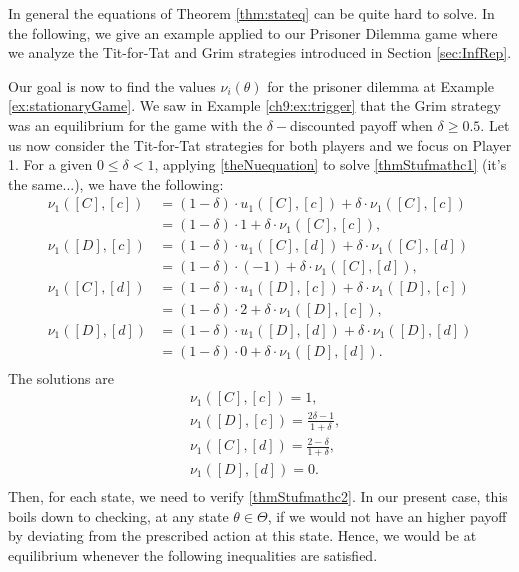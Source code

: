 In general the equations of Theorem \ref{thm:stateq} can be quite hard to solve. In the following, we give an example applied to our Prisoner Dilemma game where we analyze the Tit-for-Tat and Grim strategies introduced in Section \ref{sec:InfRep}.

\begin{example}
Our goal is now to find the values $\nu_i(\theta)$ for the prisoner dilemma at Example \ref{ex:stationaryGame}.
We saw in Example \ref{ch9:ex:trigger} that the Grim strategy was an equilibrium for the game with the $\delta-$discounted payoff when $\delta \geq 0.5$.
Let us now consider the Tit-for-Tat strategies for both players and we focus on Player 1.
For a given $0 \leq \delta < 1$, applying \eqref{theNuequation} to solve \eqref{thmStufmathc1} (it's the same...), we have the following:
$$
\begin{aligned}
\nu_1([C],[c])
& = (1-\delta) \cdot u_1([C],[c]) + \delta \cdot \nu_1([C],[c]) \\
& = (1-\delta) \cdot 1 + \delta \cdot \nu_1([C],[c]), \\
\nu_1([D],[c])
& = (1-\delta) \cdot u_1([C],[d]) + \delta \cdot \nu_1([C],[d]) \\ %
& = (1-\delta) \cdot (-1) + \delta \cdot \nu_1([C],[d]), \\
\nu_1([C],[d])
& = (1-\delta) \cdot u_1([D],[c]) + \delta \cdot \nu_1([D],[c]) \\
& = (1-\delta) \cdot 2 + \delta \cdot \nu_1([D],[c]), \\
\nu_1([D],[d])
& = (1-\delta) \cdot u_1([D],[d]) + \delta \cdot \nu_1([D],[d]) \\
& = (1-\delta) \cdot 0 + \delta \cdot \nu_1([D],[d]). \\
\end{aligned}
$$
The solutions are
$$
\begin{aligned}
& \nu_1([C],[c]) =  1 , \\
& \nu_1([D],[c]) = \frac{2\delta - 1}{1+\delta}, \\
& \nu_1([C],[d]) = \frac{2- \delta}{1+\delta}, \\
& \nu_1([D],[d]) = 0. \\
\end{aligned}
$$
Then, for each state, we need to verify \eqref{thmStufmathc2}. In our present case, this boils down to checking, at any state $\theta \in \Theta$, if we would not have an higher payoff by deviating from the prescribed action at this state. Hence, we would be at equilibrium whenever the following inequalities are satisfied.

\end{example}
